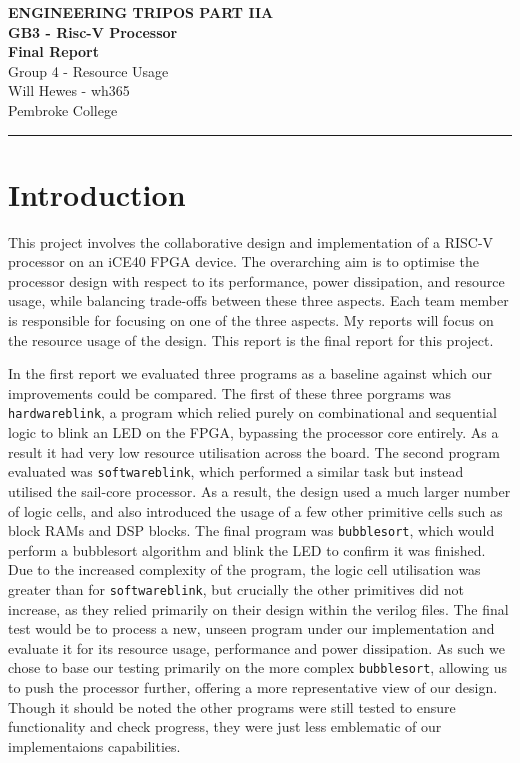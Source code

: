 \documentclass[a4paper,10pt]{article}
\renewcommand{\maketitle}{
    \begin{center}
        \LARGE \textbf{ENGINEERING TRIPOS PART IIA} \\ 
        \vspace{0.5em}
        \Large \textbf{GB3 - Risc-V Processor} \\ 
        \vspace{0.5em}
        \textbf{Final Report} \\
        \large Group 4 - Resource Usage \\
        \vspace{1em}
        \large Will Hewes - wh365 \\ 
        Pembroke College \\ 
        \vspace{0.5em}
    \end{center}
}
\begin{document}

\maketitle
\hrule
\tableofcontents
\newpage
{} \setcounter{page}{1}

\section{Introduction}
\label{sec:Introduction}

This project involves the collaborative design and implementation 
of a RISC-V processor on an iCE40 FPGA device. 
The overarching aim is to optimise 
the processor design with respect to its 
performance, power dissipation, and resource usage, 
while balancing trade-offs between these three aspects. 
Each team member is responsible for focusing on one of the three aspects.
My reports will focus on the resource usage of the design.
This report is the final report for this project.

In the first report we evaluated three programs as a baseline against
which our improvements could be compared.
The first of these three porgrams was \texttt{hardwareblink},
a program which relied purely on combinational and sequential logic
to blink an LED on the FPGA,
bypassing the processor core entirely. 
As a result it had very low resource utilisation across the board.
The second program evaluated was \texttt{softwareblink},
which performed a similar task but instead utilised the sail-core processor.
As a result, the design used a much larger number of logic cells,
and also introduced the usage of a few other primitive cells such as 
block RAMs and DSP blocks.
The final program was \texttt{bubblesort}, which would perform a 
bubblesort algorithm and blink the LED to confirm it was finished.
Due to the increased complexity of the program,
the logic cell utilisation was greater than for \texttt{softwareblink},
but crucially the other primitives did not increase, 
as they relied primarily on their design within the verilog files.
The final test would be to process 
a new, unseen program under our implementation and evaluate it for its 
resource usage, performance and power dissipation.
As such we chose to base our testing primarily 
on the more complex \texttt{bubblesort},
allowing us to push the processor further,
offering a more representative view of our design.
Though it should be noted the other programs were still tested
to ensure functionality and check progress,
they were just less emblematic of our implementaions capabilities.
\end{document}
